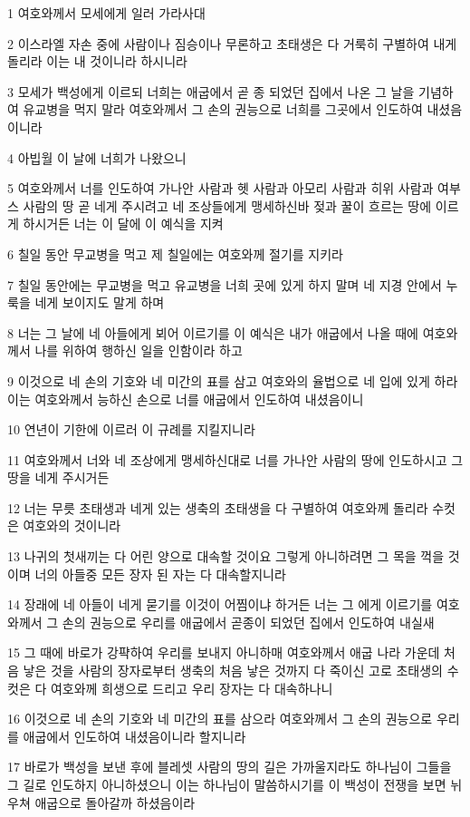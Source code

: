 \par 1 여호와께서 모세에게 일러 가라사대
\par 2 이스라엘 자손 중에 사람이나 짐승이나 무론하고 초태생은 다 거룩히 구별하여 내게 돌리라 이는 내 것이니라 하시니라
\par 3 모세가 백성에게 이르되 너희는 애굽에서 곧 종 되었던 집에서 나온 그 날을 기념하여 유교병을 먹지 말라 여호와께서 그 손의 권능으로 너희를 그곳에서 인도하여 내셨음이니라
\par 4 아빕월 이 날에 너희가 나왔으니
\par 5 여호와께서 너를 인도하여 가나안 사람과 헷 사람과 아모리 사람과 히위 사람과 여부스 사람의 땅 곧 네게 주시려고 네 조상들에게 맹세하신바 젖과 꿀이 흐르는 땅에 이르게 하시거든 너는 이 달에 이 예식을 지켜
\par 6 칠일 동안 무교병을 먹고 제 칠일에는 여호와께 절기를 지키라
\par 7 칠일 동안에는 무교병을 먹고 유교병을 너희 곳에 있게 하지 말며 네 지경 안에서 누룩을 네게 보이지도 말게 하며
\par 8 너는 그 날에 네 아들에게 뵈어 이르기를 이 예식은 내가 애굽에서 나올 때에 여호와께서 나를 위하여 행하신 일을 인함이라 하고
\par 9 이것으로 네 손의 기호와 네 미간의 표를 삼고 여호와의 율법으로 네 입에 있게 하라 이는 여호와께서 능하신 손으로 너를 애굽에서 인도하여 내셨음이니
\par 10 연년이 기한에 이르러 이 규례를 지킬지니라
\par 11 여호와께서 너와 네 조상에게 맹세하신대로 너를 가나안 사람의 땅에 인도하시고 그 땅을 네게 주시거든
\par 12 너는 무릇 초태생과 네게 있는 생축의 초태생을 다 구별하여 여호와께 돌리라 수컷은 여호와의 것이니라
\par 13 나귀의 첫새끼는 다 어린 양으로 대속할 것이요 그렇게 아니하려면 그 목을 꺽을 것이며 너의 아들중 모든 장자 된 자는 다 대속할지니라
\par 14 장래에 네 아들이 네게 묻기를 이것이 어찜이냐 하거든 너는 그 에게 이르기를 여호와께서 그 손의 권능으로 우리를 애굽에서 곧종이 되었던 집에서 인도하여 내실새
\par 15 그 때에 바로가 강퍅하여 우리를 보내지 아니하매 여호와께서 애굽 나라 가운데 처음 낳은 것을 사람의 장자로부터 생축의 처음 낳은 것까지 다 죽이신 고로 초태생의 수컷은 다 여호와께 희생으로 드리고 우리 장자는 다 대속하나니
\par 16 이것으로 네 손의 기호와 네 미간의 표를 삼으라 여호와께서 그 손의 권능으로 우리를 애굽에서 인도하여 내셨음이니라 할지니라
\par 17 바로가 백성을 보낸 후에 블레셋 사람의 땅의 길은 가까울지라도 하나님이 그들을 그 길로 인도하지 아니하셨으니 이는 하나님이 말씀하시기를 이 백성이 전쟁을 보면 뉘우쳐 애굽으로 돌아갈까 하셨음이라
